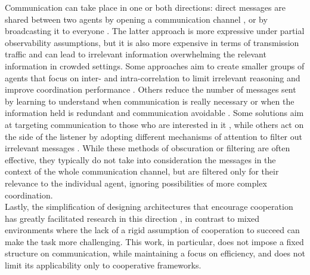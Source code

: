 \documentclass[a4paper,singleside,12pt]{report} %
\begin{document}
Communication can take place in one or both directions: direct messages are shared between two agents by opening a communication channel \cite{Niu2021MultiAgentGC, Zhao2022TargetedMC}, or by broadcasting it to everyone \cite{Kim2021CommunicationIM, Lin2021LearningTG, Sukhbaatar2016LearningMC, Das2018TarMACTM}. The latter approach is more expressive under partial observability assumptions, but it is also more expensive in terms of transmission traffic and can lead to irrelevant information overwhelming the relevant information in crowded settings. Some approaches aim to create smaller groups of agents that focus on inter- and intra-correlation to limit irrelevant reasoning and improve coordination performance \cite{Liu2021LearningCF, Niu2021MultiAgentGC, Liu2020When2comMP, Niu2021MultiAgentGC, Jiang2018LearningAC}. Others reduce the number of messages sent by learning to understand when communication is really necessary or when the information held is redundant and communication avoidable \cite{Liu2020When2comMP, Ding2020LearningII}. Some solutions aim at targeting communication to those who are interested in it \cite{Zhao2022TargetedMC}, while others act on the side of the listener by adopting different mechanisms of attention to filter out irrelevant messages \cite{Li2021LearningED, Kim2021CommunicationIM, Sukhbaatar2016LearningMC, Das2018TarMACTM}. While these methods of obscuration or filtering are often effective, they typically do not take into consideration the messages in the context of the whole communication channel, but are filtered only for their relevance to the individual agent, ignoring possibilities of more complex coordination.\\
Lastly, the simplification of designing architectures that encourage cooperation has greatly facilitated research in this direction \cite{Foerster2017CounterfactualMP, Li2021LearningED, Liu2021LearningCF, Mao2017ACCNetAN, Ding2020LearningII, Sukhbaatar2016LearningMC}, in contrast to mixed environments \cite{Tu2021AdversarialAO, Blumenkamp2020TheEO} where the lack of a rigid assumption of cooperation to succeed can make the task more challenging. This work, in particular, does not impose a fixed structure on communication, while maintaining a focus on efficiency, and does not limit its applicability only to cooperative frameworks.
\end{document}
